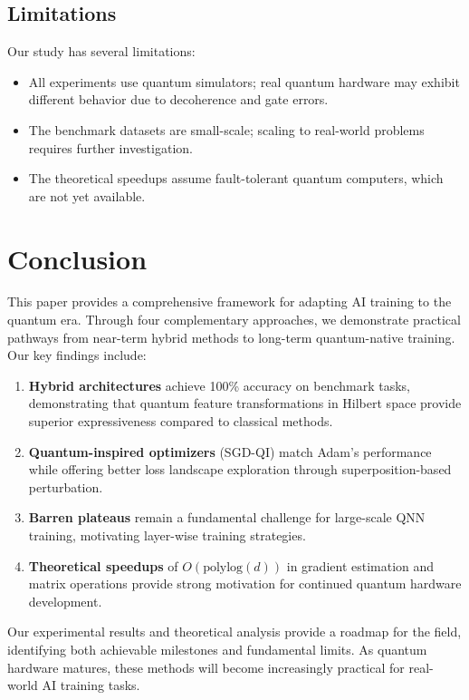 \documentclass[11pt,a4paper]{article}
\begin{document}
\subsection{Limitations}
Our study has several limitations:
\begin{itemize}
    \item All experiments use quantum simulators; real quantum hardware may exhibit different behavior due to decoherence and gate errors.
    \item The benchmark datasets are small-scale; scaling to real-world problems requires further investigation.
    \item The theoretical speedups assume fault-tolerant quantum computers, which are not yet available.
\end{itemize}

\section{Conclusion}
This paper provides a comprehensive framework for adapting AI training to the quantum era. Through four complementary approaches, we demonstrate practical pathways from near-term hybrid methods to long-term quantum-native training. Our key findings include:

\begin{enumerate}
    \item \textbf{Hybrid architectures} achieve 100\% accuracy on benchmark tasks, demonstrating that quantum feature transformations in Hilbert space provide superior expressiveness compared to classical methods.
    \item \textbf{Quantum-inspired optimizers} (SGD-QI) match Adam's performance while offering better loss landscape exploration through superposition-based perturbation.
    \item \textbf{Barren plateaus} remain a fundamental challenge for large-scale QNN training, motivating layer-wise training strategies.
    \item \textbf{Theoretical speedups} of $O(\text{polylog}(d))$ in gradient estimation and matrix operations provide strong motivation for continued quantum hardware development.
\end{enumerate}

Our experimental results and theoretical analysis provide a roadmap for the field, identifying both achievable milestones and fundamental limits. As quantum hardware matures, these methods will become increasingly practical for real-world AI training tasks.



\end{document}
